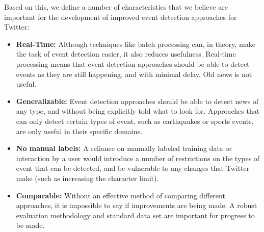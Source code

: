 Based on this, we define a number of characteristics that we believe are important for the development of improved event detection approaches for Twitter:
\begin{itemize}

	\item \textbf{Real-Time:} Although techniques like batch processing can, in theory, make the task of event detection easier, it also reduces usefulness.
	Real-time processing means that event detection approaches should be able to detect events as they are still happening, and with minimal delay.
	Old news is not useful. \\

	\item \textbf{Generalizable:} Event detection approaches should be able to detect news of any type, and without being explicitly told what to look for. Approaches that can only detect certain types of event, such as earthquakes or sports events, are only useful in their specific domains. \\

	\item \textbf{No manual labels:} A reliance on manually labeled training data or interaction by a user would introduce a number of restrictions on the types of event that can be detected, and be vulnerable to any changes that Twitter make (such as increasing the character limit). \\

	\item \textbf{Comparable:} Without an effective method of comparing different approaches, it is impossible to say if improvements are being made. A robust  evaluation methodology and standard data set are important for progress to be made.  \\

\end{itemize}

